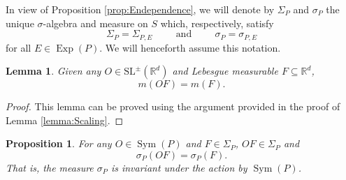 \documentclass[11pt, letter]{book}
\newtheorem{lemma}[theorem]{Lemma}
\newtheorem{proposition}[theorem]{Proposition}
\newcommand\Sym{\operatorname{Sym}}
\newcommand\Exp{\operatorname{Exp}}
\begin{document}
\noindent In view of Proposition \ref{prop:Endependence}, we will denote by $\Sigma_P$ and $\sigma_P$ the unique $\sigma$-algebra and measure on $S$ which, respectively, satisfy
\begin{equation*}
    \Sigma_P=\Sigma_{P,E}\hspace{1cm}\mbox{and}\hspace{1cm}\sigma_P=\sigma_{P,E}
\end{equation*}
for all $E\in\Exp(P)$. We will henceforth assume this notation. 


\begin{framed}
\begin{lemma}\label{lem:SLInvariance}
Given any $O\in  \text{SL}^{\pm}(\mathbb{R}^d)$ and Lebesgue measurable $F\subseteq\mathbb{R}^d$,
\begin{equation*}
    m(OF)=m(F).
\end{equation*}
\end{lemma}
\end{framed}

\begin{proof}
This lemma can be proved using the argument provided in the proof of Lemma \ref{lemma:Scaling}. 
\end{proof}



\begin{framed}
\begin{proposition}\label{prop:SymInvariance}
For any $O\in\Sym(P)$ and $F\in\Sigma_P$,  $OF\in\Sigma_P$ and
\begin{equation*}
\sigma_P(O F)=\sigma_P(F).
\end{equation*} 
That is, the measure $\sigma_P$ is invariant under the action by $\Sym(P)$.
\end{proposition}
\end{framed}
\end{document}
